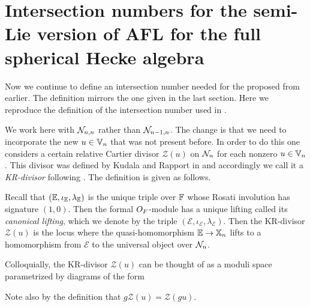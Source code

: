 \section{Intersection numbers for the semi-Lie version of AFL for the full spherical Hecke algebra}
Now we continue to define an intersection number needed for the proposed
 from earlier.
The definition mirrors the one given in the last section.
Here we reproduce the definition of the intersection number used in .

We work here with $\mathcal N_{n,n}$ rather than $\mathcal N_{n-1,n}$.
The change is that we need to incorporate the new $u \in \mathbb V_n$ that was not present before.
In order to do this one considers a certain relative Cartier divisor $\mathcal Z(u)$
on $\mathcal N_n$ for each nonzero $u \in \mathbb V_n$.
This divisor was defined by Kudala and Rapport in \cite{ref:KR}
and accordingly we call it a \emph{KR-divisor} following \cite[\S4.3]{ref:survey}.
The definition is given as follows.
\begin{definition}
  Recall that $(\mathbb E, \iota_\mathbb E, \lambda_\mathbb E)$ is the unique triple over $\mathbb F$
  whose Rosati involution has signature $(1,0)$.
  Then the formal $O_F$-module has a unique lifting called its \emph{canonical lifting},
  which we denote by the triple $(\mathcal{E}, \iota_{\mathcal{E}}, \lambda_{\mathcal E})$.
  Then the KR-divisor $\mathcal Z(u)$ is the locus where the quasi-homomorphism
  $\mathbb E \to \mathbb X_n$ lifts to a homomorphism from $\mathcal{E}$ to the universal object over $\mathcal N_n$.
\end{definition}
Colloquially, the KR-divisor $\mathcal Z(u)$ can be thought of as a
moduli space parametrized by diagrams of the form
\begin{center}
\end{center}
Note also by the definition that $g \mathcal Z(u) = \mathcal Z (gu)$.


